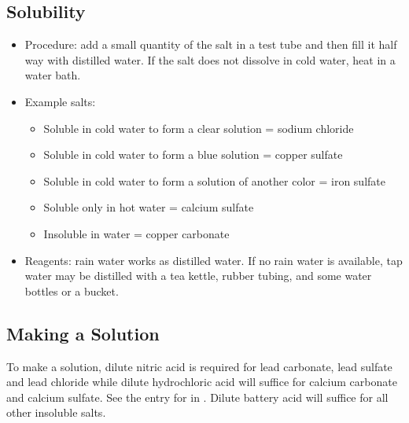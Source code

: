 \subsection{Solubility}
\begin{itemize}
\item{Procedure: add a small quantity of the salt in a test tube 
and then fill it half way with distilled water. 
If the salt does not dissolve in cold water, 
heat in a water bath.}
\item{Example salts:}
\begin{itemize}
\item{Soluble in cold water to form a clear solution = sodium chloride}
\item{Soluble in cold water to form a blue solution = copper sulfate}
\item{Soluble in cold water to form a solution of another color = iron sulfate}
\item{Soluble only in hot water = calcium sulfate} 
\item{Insoluble in water = copper carbonate}
\end{itemize}
\item{Reagents: rain water works as distilled water. 
If no rain water is available, 
tap water may be distilled with a tea kettle, 
rubber tubing, 
and some water bottles or a bucket.}
\end{itemize}

\subsection{Making a Solution}

To make a solution, 
dilute nitric acid is required for lead carbonate, 
lead sulfate and lead chloride 
while dilute hydrochloric acid will suffice 
for calcium carbonate and calcium sulfate. 
See the entry for  in . 
Dilute battery acid will suffice for all other insoluble salts. 

